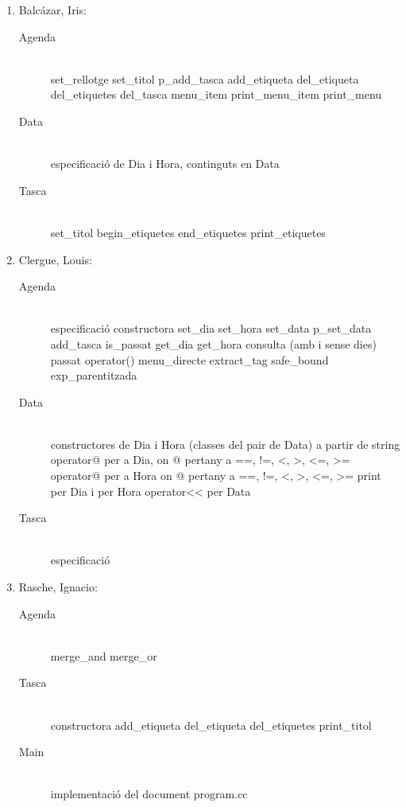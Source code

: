 \documentclass[a4paper,10pt]{article}
\begin{document}
\begin{enumerate}
  \item \textsf{Balc\'{a}zar, Iris}:
  \begin{description}
    \item[Agenda] \hfill \\
    set_rellotge
    set_titol
    p_add_tasca    
    add_etiqueta
    del_etiqueta
    del_etiquetes
    del_tasca
    menu_item
    print_menu_item
    print_menu
    \item[Data] \hfill \\
    especificaci\'o de Dia i Hora, continguts en Data
    \item[Tasca] \hfill \\
    set_titol
    begin_etiquetes
    end_etiquetes
    print_etiquetes
  \end{description}
  \item \textsf{Clergue, Louis}:
  \begin{description}
    \item[Agenda] \hfill \\
    especificaci\'o
    constructora
    set_dia
    set_hora
    set_data
    p_set_data
    add_tasca
    is_passat
    get_dia
    get_hora
    consulta (amb i sense dies)
    passat
    operator()
    menu_directe
    extract_tag
    safe_bound
    exp_parentitzada
    \item[Data] \hfill \\
    constructores de Dia i Hora (classes del pair de Data) a partir de string
    operator@ per a Dia, on @ pertany a { ==, !=, <, >, <=, >=}
    operator@ per a Hora on @ pertany a { ==, !=, <, >, <=, >=}
    print per Dia i per Hora
    operator<< per Data
    \item[Tasca] \hfill \\
    especificaci\'o
  \end{description}
  \item \textsf{Rasche, Ignacio}:
  \begin{description}
    \item[Agenda] \hfill \\
    merge_and
    merge_or
    \item[Tasca] \hfill \\
    constructora
    add_etiqueta
    del_etiqueta
    del_etiquetes
    print_titol
    \item[Main] \hfill \\
    implementaci\'o del document program.cc
  \end{description}
\end{enumerate}
\end{document}

